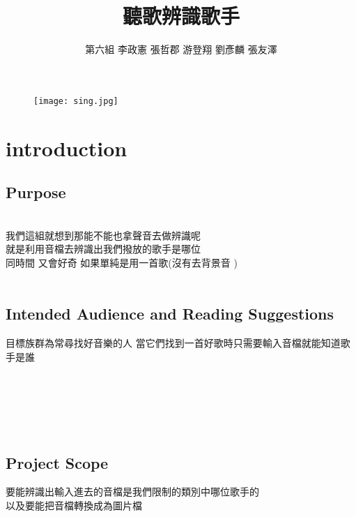 \documentclass{article}
\begin{document}
\begin{CJK}{UTF8}{bkai}
\title{\Huge \color{blue} 聽歌辨識歌手 }
\author{第六組   李政憲 張哲郡 游登翔 劉彥麟 張友澤}
\maketitle
\begin{figure}[h]
\begin{center}
\texttt{[image: sing.jpg]}
\end{center}
\label{fig:1}
\end{figure}
\newpage
\section{\huge \bf \color{blue}  introduction\\}

\subsection{\Large Purpose\\}
\\ 我們這組就想到那能不能也拿聲音去做辨識呢\\ 就是利用音檔去辨識出我們撥放的歌手是哪位
\\同時間 又會好奇 如果單純是用一首歌(沒有去背景音 )\\
\\

\subsection{\Large Intended Audience and Reading Suggestions\\}
\large 目標族群為常尋找好音樂的人 當它們找到一首好歌時只需要輸入音檔就能知道歌手是誰\\\\\\\\\\\\
\subsection{Project Scope\\}
要能辨識出輸入進去的音檔是我們限制的類別中哪位歌手的\\
 以及要能把音檔轉換成為圖片檔
\newpage



\end{CJK}
\end{document}
